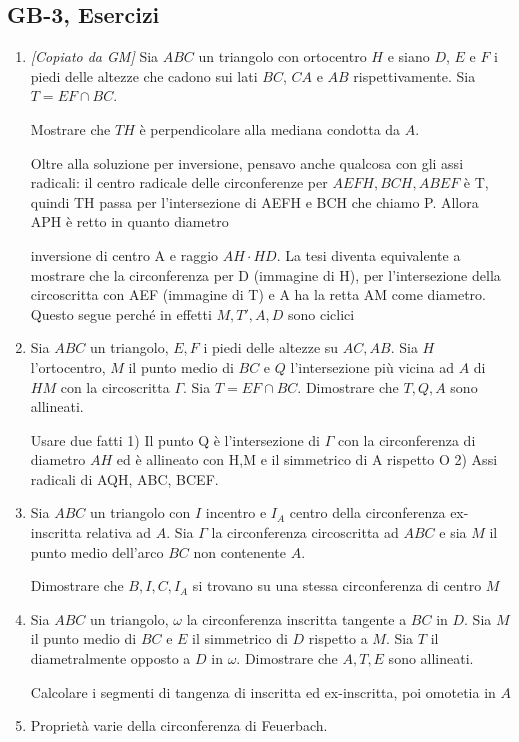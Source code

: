 \subsection{GB-3, Esercizi}
\begin{enumerate}

	\item \emph{[Copiato da GM]} Sia $ABC$ un triangolo con ortocentro $H$ e siano $D$, $E$ e $F$ i piedi delle altezze che cadono sui lati $BC$, $CA$ e $AB$ rispettivamente. Sia $T=EF\cap BC$.
	
	Mostrare che $TH$ è perpendicolare alla mediana condotta da $A$.
	
	\begin{sol}Oltre alla soluzione per inversione, pensavo anche qualcosa con gli assi radicali: il centro radicale delle circonferenze per $AEFH, BCH, ABEF$ è T, quindi TH passa per l'intersezione di AEFH e BCH che chiamo P. Allora APH è retto in quanto diametro


    inversione di centro A e raggio $AH\cdot HD$. La tesi diventa equivalente a mostrare che la circonferenza per D (immagine di H), per l'intersezione della circoscritta con AEF (immagine di T) e A ha la retta AM come diametro. Questo segue perché in effetti $M,T',A,D$ sono ciclici
	\end{sol}
	
	
	\item Sia $ABC$ un triangolo, $E,F$ i piedi delle altezze su $AC,AB$. Sia $H$ l'ortocentro, $M$ il punto medio di $BC$ e $Q$ l'intersezione più vicina ad $A$ di $HM$ con la circoscritta $\Gamma$. Sia $T=EF\cap BC$. Dimostrare che $T,Q,A$ sono allineati.
	
	\begin{sol} Usare due fatti 1) Il punto Q è l'intersezione di $\Gamma$ con la circonferenza di diametro $AH$ ed è allineato con H,M e il simmetrico di A rispetto O 2) Assi radicali di AQH, ABC, BCEF.
\end{sol}	
	
	\item Sia $ABC$ un triangolo con $I$ incentro e $I_A$ centro della circonferenza ex-inscritta relativa ad $A$. Sia $\Gamma$ la circonferenza circoscritta ad $ABC$ e sia $M$ il punto medio dell'arco $BC$ non contenente $A$.
	
	Dimostrare che $B,I,C,I_A$ si trovano su una stessa circonferenza di centro $M$
	
	\item Sia $ABC$ un triangolo, $\omega$ la circonferenza inscritta tangente a $BC$ in $D$. Sia $M$ il punto medio di $BC$ e $E$ il simmetrico di $D$ rispetto a $M$. Sia $T$ il diametralmente opposto a $D$ in $\omega$. Dimostrare che $A,T,E$ sono allineati.
	
\begin{sol}Calcolare i segmenti di tangenza di inscritta ed ex-inscritta, poi omotetia in $A$
 
\end{sol}

	
	\item Proprietà varie della circonferenza di Feuerbach. 
	\end{enumerate}
\clearpage

